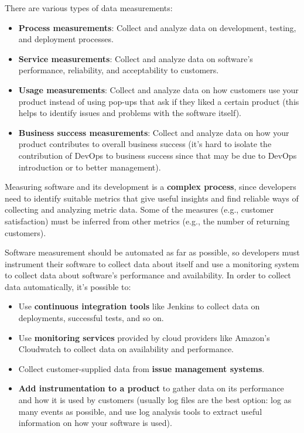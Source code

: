 \noindent There are various types of data measurements:
\begin{itemize}
    \item \textbf{Process measurements}: Collect and analyze data on development, testing, and deployment processes.
    \item \textbf{Service measurements}: Collect and analyze data on software’s performance, reliability, and acceptability to customers.
    \item \textbf{Usage measurements}: Collect and analyze data on how customers use your product instead of using pop-ups that ask if they liked a certain product (this helps to identify issues and problems with the software itself).
    \item \textbf{Business success measurements}: Collect and analyze data on how your product contributes to overall business success (it's hard to isolate the contribution of DevOps to business success since that may be due to DevOps introduction or to better management).
\end{itemize}

Measuring software and its development is a \textbf{complex process}, since developers need to identify suitable metrics that give useful insights and find reliable ways of collecting and analyzing metric data. Some of the measures (e.g., customer satisfaction) must be inferred from other metrics (e.g., the number of returning customers).

Software measurement should be automated as far as possible, so developers must instrument their software to collect data about itself and use a monitoring system to collect data about software’s performance and availability. \newline \noindent In order to collect data automatically, it's possible to:

\begin{itemize}
    \item Use \textbf{continuous integration tools} like Jenkins to collect data on deployments, successful tests, and so on.
    \item Use \textbf{monitoring services} provided by cloud providers like Amazon’s Cloudwatch to collect data on availability and performance.
    \item Collect customer-supplied data from \textbf{issue management systems}.
    \item \textbf{Add instrumentation to a product} to gather data on its performance and how it is used by customers (usually log files are the best option: log as many events as possible, and use log analysis tools to extract useful information on how your software is used).
\end{itemize}

